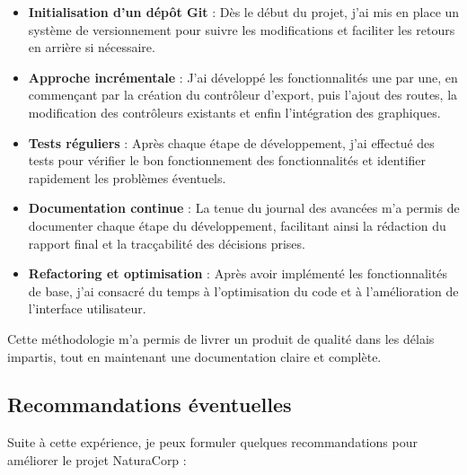 \documentclass[a4paper,12pt]{report}
\begin{document}
  \begin{itemize}
    \item \textbf{Initialisation d'un dépôt Git} : Dès le début du projet, j'ai mis en place un système de versionnement pour suivre les modifications et faciliter les retours en arrière si nécessaire.
    
    \item \textbf{Approche incrémentale} : J'ai développé les fonctionnalités une par une, en commençant par la création du contrôleur d'export, puis l'ajout des routes, la modification des contrôleurs existants et enfin l'intégration des graphiques.
    
    \item \textbf{Tests réguliers} : Après chaque étape de développement, j'ai effectué des tests pour vérifier le bon fonctionnement des fonctionnalités et identifier rapidement les problèmes éventuels.
    
    \item \textbf{Documentation continue} : La tenue du journal des avancées m'a permis de documenter chaque étape du développement, facilitant ainsi la rédaction du rapport final et la tracçabilité des décisions prises.
    
    \item \textbf{Refactoring et optimisation} : Après avoir implémenté les fonctionnalités de base, j'ai consacré du temps à l'optimisation du code et à l'amélioration de l'interface utilisateur.
  \end{itemize}
  
  Cette méthodologie m'a permis de livrer un produit de qualité dans les délais impartis, tout en maintenant une documentation claire et complète.

  \subsection{Recommandations éventuelles}
  Suite à cette expérience, je peux formuler quelques recommandations pour améliorer le projet NaturaCorp :
  
\end{document}
